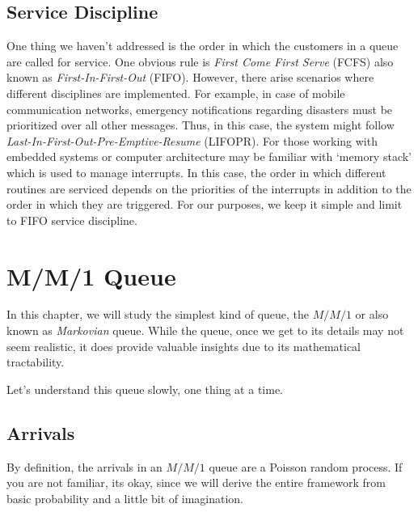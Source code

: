 \documentclass[11pt, a4paper]{report}
\begin{document}
\section{Service Discipline}
One thing we haven't addressed is the order in which the customers in a queue are called for service. One obvious rule is \emph{First Come First Serve} (FCFS) also known as \emph{First-In-First-Out} (FIFO). However, there arise scenarios where different disciplines are implemented. For example,  in case of mobile communication networks, emergency notifications regarding disasters must be prioritized over all other messages. Thus, in this case, the system might follow \emph{Last-In-First-Out-Pre-Emptive-Resume} (LIFOPR). For those working with embedded systems or computer architecture may be familiar with `memory stack' which is used to manage interrupts. In this case, the order in which different routines are serviced depends on the priorities of the interrupts in addition to the order in which they are triggered. For our purposes, we keep it simple and limit to FIFO service discipline.     

\chapter{M/M/1 Queue}
In this chapter, we will study the simplest kind of queue, the $M/M/1$ or also known as \emph{Markovian} queue. While the queue, once we get to its details may not seem realistic, it does provide valuable insights due to its mathematical tractability.


Let's understand this queue slowly, one thing at a time.

\section{Arrivals}
By definition, the arrivals in an $M/M/1$ queue are a Poisson random process. If you are not familiar, its okay, since we will derive the entire framework from basic probability and a little bit of imagination.
\end{document}

